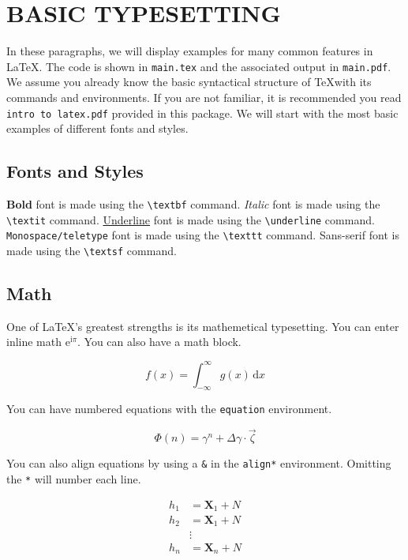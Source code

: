 \clearpage
\chapter{BASIC TYPESETTING}
\doublespacing

In these paragraphs, we will display examples for many common features in \LaTeX. The code is shown in \texttt{main.tex} and the associated output in \texttt{main.pdf}. We assume you already know the basic syntactical structure of \TeX with its commands and environments. If you are not familiar, it is recommended you read \texttt{intro to latex.pdf} provided in this package. We will start with the most basic examples of different fonts and styles.

\section*{Fonts and Styles}

\textbf{Bold} font is made using the \texttt{\textbackslash textbf} command. \textit{Italic} font is made using the \texttt{\textbackslash textit} command. \underline{Underline} font is made using the \texttt{\textbackslash underline} command. \texttt{Monospace/teletype} font is made using the \texttt{\textbackslash texttt} command. \textsf{Sans-serif} font is made using the \texttt{\textbackslash textsf} command.

\section*{Math}

One of \LaTeX's greatest strengths is its mathemetical typesetting. You can enter inline math $\mathrm{e}^{\mathrm{i}\pi}$. You can also have a math block.

$$
f(x) = \int _{-\infty} ^\infty g(x) \, \mathrm{d}x
$$

You can have numbered equations with the \texttt{equation} environment.

\begin{equation}
	\Phi(n) = \gamma^n + \Delta \gamma \cdot \vec{\zeta} \label{eqn:exampleEqn}
\end{equation}

You can also align equations by using a \texttt{\&} in the \texttt{align*} environment. Omitting the \texttt{*} will number each line.

\begin{align*}
	h_1 &= \mathbf{X}_1 + N \\
	h_2 &= \mathbf{X}_1 + N \\
	&\vdots \\
	h_n &= \mathbf{X}_n + N \\
\end{align*}

